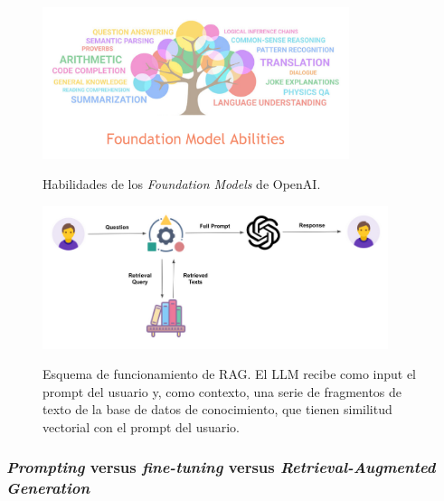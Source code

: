 \begin{figure}[H]
  \caption{Habilidades de los \emph{Foundation Models} de OpenAI.}
  \centering
  \includegraphics[width=0.8\textwidth]{./figuras/fundation_models_habilities.png}
  \label{fig:fundation_models_habilities}
\end{figure}

\begin{figure}[H]
    \caption[Esquema de funcionamiento de RAG]{Esquema de funcionamiento de RAG. El LLM recibe como input el {prompt} del usuario y, como contexto, una serie de fragmentos de texto de la base de datos de conocimiento, que tienen similitud vectorial con el {prompt} del usuario.}
    \centering
    \includegraphics[width=0.9\textwidth]{./figuras/rag.png}
    \label{fig:rag}
\end{figure}


\subsubsection{\emph{Prompting} versus \emph{fine-tuning} versus \emph{Retrieval-Augmented Generation}}

